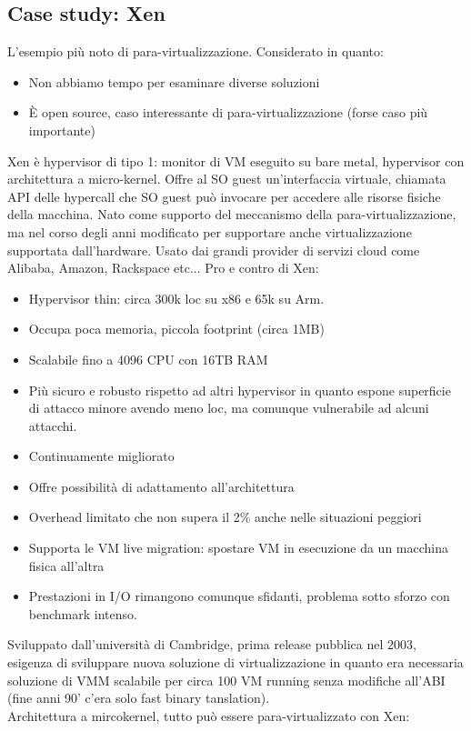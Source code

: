 \documentclass[16px]{article}
\begin{document}
\subsection{Case study: Xen}
L'esempio più noto di para-virtualizzazione. Considerato in quanto:
\begin{itemize}
\item Non abbiamo tempo per esaminare diverse soluzioni
\item È open source, caso interessante di para-virtualizzazione (forse caso più importante)
\end{itemize}
Xen è hypervisor di tipo 1: monitor di VM eseguito su bare metal, hypervisor con architettura a micro-kernel. Offre al SO guest un'interfaccia virtuale, chiamata API delle hypercall che SO guest può invocare per accedere alle risorse fisiche della macchina. Nato come supporto del meccanismo della para-virtualizzazione, ma nel corso degli anni modificato per supportare anche virtualizzazione supportata dall'hardware. Usato dai grandi provider di servizi cloud come Alibaba, Amazon, Rackspace etc...
Pro e contro di Xen:
\begin{itemize}
\item Hypervisor thin: circa 300k loc su x86 e 65k su Arm.
\item Occupa poca memoria, piccola footprint (circa 1MB)
\item Scalabile fino a 4096 CPU con 16TB RAM
\item Più sicuro e robusto rispetto ad altri hypervisor in quanto espone superficie di attacco minore avendo meno loc, ma comunque vulnerabile ad alcuni attacchi.
\item Continuamente migliorato
\item Offre possibilità di adattamento all'architettura
\item Overhead limitato che non supera il 2\% anche nelle situazioni peggiori
\item Supporta le VM live migration: spostare VM in esecuzione da un macchina fisica all'altra
\item Prestazioni in I/O rimangono comunque sfidanti, problema sotto sforzo con benchmark intenso.
\end{itemize}
Sviluppato dall'università di Cambridge, prima release pubblica nel 2003, esigenza di sviluppare nuova soluzione di virtualizzazione in quanto era necessaria soluzione di VMM scalabile per circa 100 VM running senza modifiche all'ABI (fine anni 90' c'era solo fast binary tanslation).\\ Architettura a mircokernel, tutto può essere para-virtualizzato con Xen:
\end{document}
